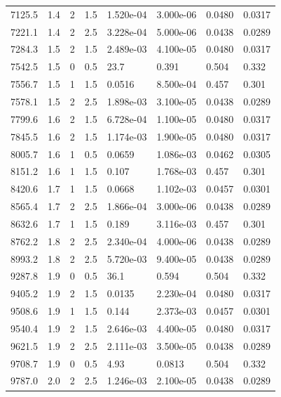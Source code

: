\documentclass[preview]{standalone}
\begin{document}
{{{\begin{tabular}{L{1.2cm}C{1.2cm} C{0.3cm}C{0.5cm} C{1.4cm}C{1.4cm} C{1.4cm}C{1.4cm}}
  7125.5  &   1.4  & 2     & 1.5 &  1.520e-04  & 3.000e-06  & 0.0480 &  0.0317   \\ 
  7221.1  &   1.4  & 2     & 2.5 &  3.228e-04  & 5.000e-06  & 0.0438 &  0.0289   \\ 
  7284.3  &   1.5  & 2     & 1.5 &  2.489e-03  & 4.100e-05  & 0.0480 &  0.0317   \\ 
  7542.5  &   1.5  & 0     & 0.5 &  23.7  & 0.391  & 0.504 &  0.332   \\ 
  7556.7  &   1.5  & 1     & 1.5 &  0.0516  & 8.500e-04  & 0.457 &  0.301   \\ 
  7578.1  &   1.5  & 2     & 2.5 &  1.898e-03  & 3.100e-05  & 0.0438 &  0.0289   \\ 
  7799.6  &   1.6  & 2     & 1.5 &  6.728e-04  & 1.100e-05  & 0.0480 &  0.0317   \\ 
  7845.5  &   1.6  & 2     & 1.5 &  1.174e-03  & 1.900e-05  & 0.0480 &  0.0317   \\ 
  8005.7  &   1.6  & 1     & 0.5 &  0.0659  & 1.086e-03  & 0.0462 &  0.0305   \\ 
  8151.2  &   1.6  & 1     & 1.5 &  0.107  & 1.768e-03  & 0.457 &  0.301   \\ 
  8420.6  &   1.7  & 1     & 1.5 &  0.0668  & 1.102e-03  & 0.0457 &  0.0301   \\ 
  8565.4  &   1.7  & 2     & 2.5 &  1.866e-04  & 3.000e-06  & 0.0438 &  0.0289   \\ 
  8632.6  &   1.7  & 1     & 1.5 &  0.189  & 3.116e-03  & 0.457 &  0.301   \\ 
  8762.2  &   1.8  & 2     & 2.5 &  2.340e-04  & 4.000e-06  & 0.0438 &  0.0289   \\ 
  8993.2  &   1.8  & 2     & 2.5 &  5.720e-03  & 9.400e-05  & 0.0438 &  0.0289   \\ 
  9287.8  &   1.9  & 0     & 0.5 &  36.1  & 0.594  & 0.504 &  0.332   \\ 
  9405.2  &   1.9  & 2     & 1.5 &  0.0135  & 2.230e-04  & 0.0480 &  0.0317   \\ 
  9508.6  &   1.9  & 1     & 1.5 &  0.144  & 2.373e-03  & 0.0457 &  0.0301   \\ 
  9540.4  &   1.9  & 2     & 1.5 &  2.646e-03  & 4.400e-05  & 0.0480 &  0.0317   \\ 
  9621.5  &   1.9  & 2     & 2.5 &  2.111e-03  & 3.500e-05  & 0.0438 &  0.0289   \\ 
  9708.7  &   1.9  & 0     & 0.5 &  4.93  & 0.0813  & 0.504 &  0.332   \\ 
  9787.0  &   2.0  & 2     & 2.5 &  1.246e-03  & 2.100e-05  & 0.0438 &  0.0289   \\ 

\end{tabular}}}}
\end{document}
